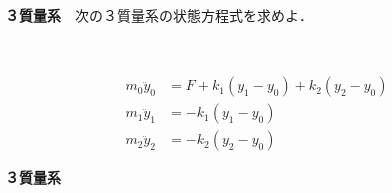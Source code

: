 \documentclass[a4paper,11pt,fleqn]{jreport}
\begin{document}
\noindent
{\bf ３質量系}　次の３質量系の状態方程式を求めよ．

\begin{minipage}{90mm}
\end{minipage}
\begin{minipage}{100mm}
\begin{align}
	m_0 \ddot{y}_0 & = F + k_1 (y_1 - y_0) + k_2 (y_2-y_0)
\nonumber \\
	m_1 \ddot{y}_1 & = - k_1 (y_1 - y_0)
\nonumber \\
	m_2 \ddot{y}_2 & = - k_2 (y_2 - y_0)
\nonumber
\end{align}
\end{minipage}


\newpage
\noindent
{\bf ３質量系}
\end{document}

